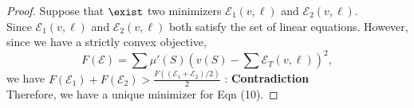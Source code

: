 \documentclass[10pt]{beamer}
\newcommand{\f}{v}
\newcommand{\ex}{\Expl}
\def\Expl{\mathcal{E}}
\begin{document}
\begin{frame}
    \begin{proof}
        Suppose that $\exist$ two minimizers $\ex_1(\f,\ell)$ and $\ex_2(\f,\ell)$. \\
        Since $\ex_1(\f,\ell)$ and $\ex_2(\f,\ell)$ both satisfy the set of linear equations. However, since we have a strictly convex objective,
        $$
        F(\ex) = \sum  \mu'(S) \left( \f(S) - \sum\Expl_T(\f,\ell) \right)^2,
        $$
        we have $F(\ex_1) + F(\ex_2) > \frac{F((\ex_1+\ex_2)/2)}{2}$ : \textbf{Contradiction} \\
        Therefore, we have a unique minimizer for Eqn (10).
    \end{proof}
\end{frame}

\end{document}
